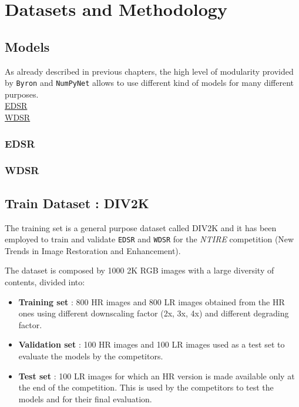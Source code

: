 \documentclass[12pt,a4paper]{report}
\begin{document}
\chapter{Datasets and Methodology}

\section{Models}

As already described in previous chapters, the high level of modularity provided by \texttt{Byron} and \texttt{NumPyNet} allows to use different kind of models for many different purposes. \\


\href{https://github.com/thstkdgus35/EDSR-PyTorch}{EDSR} \\
\href{https://github.com/JiahuiYu/wdsr_ntire2018}{WDSR}

\subsection*{EDSR}

\subsection*{WDSR}

\section{Train Dataset : DIV2K}

The training set is a general purpose dataset called DIV2K \cite{DIV2K} and it has been employed to train and validate {\tt EDSR} and {\tt WDSR} for the {\it NTIRE} competition (New Trends in Image Restoration and Enhancement).

The dataset is composed by 1000 2K RGB images with a large diversity of contents, divided into:

\begin{itemize}
 \setlength\itemsep{-0.2em}
 \item {\bf Training set} : 800 HR images and 800 LR images obtained from the HR ones using different downscaling factor (2x, 3x, 4x) and different degrading factor.
 \item {\bf Validation set} : 100 HR images and 100 LR images used as a test set to evaluate the models by the competitors.
 \item {\bf Test set} : 100 LR images for which an HR version is made available only at the end of the competition. This is used by the competitors to test the models and for their final evaluation.
\end{itemize}
\end{document}
